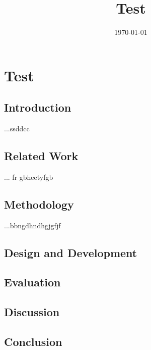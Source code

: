 \documentclass{article}
\title{Test}
\date{\today}
\begin{document}
\maketitle
\section{Test}
\subsection{Introduction}
...ssddcc

\subsection{Related Work}
... fr gbheetyfgb

\subsection{Methodology}
...bbngdhndhgjgfjf

\subsection{Design and Development}
\subsection{Evaluation}
\subsection{Discussion}
\subsection{Conclusion}

\newpage
\printbibliography
\end{document}
